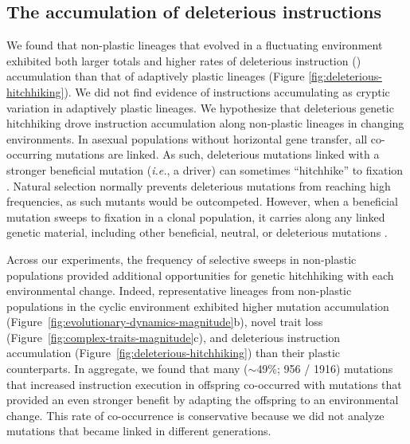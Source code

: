 \subsection{The accumulation of deleterious instructions}

We found that non-plastic lineages that evolved in a fluctuating environment exhibited both larger totals and higher rates of deleterious instruction () accumulation than that of adaptively plastic lineages (Figure \ref{fig:deleterious-hitchhiking}).
We did not find evidence of  instructions accumulating as cryptic variation in adaptively plastic lineages.
We hypothesize that deleterious genetic hitchhiking drove  instruction accumulation along non-plastic lineages in changing environments.
In asexual populations without horizontal gene transfer, all co-occurring mutations are linked.
As such, deleterious mutations linked with a stronger beneficial mutation (\textit{i.e.}, a driver) can sometimes ``hitchhike'' to fixation \citep{smith_hitch-hiking_1974,van_den_bergh_experimental_2018,buskirk_hitchhiking_2017}.
Natural selection normally prevents deleterious mutations from reaching high frequencies, as such mutants would be outcompeted.
However, when a beneficial mutation sweeps to fixation in a clonal population, it carries along any linked genetic material, including other beneficial, neutral, or deleterious mutations  \cite{barton_genetic_2000, smith_hitch-hiking_1974}.

Across our experiments, the frequency of selective sweeps in non-plastic populations provided additional opportunities for genetic hitchhiking with each environmental change. 
Indeed, representative lineages from non-plastic populations in the cyclic environment exhibited higher mutation accumulation (Figure~\ref{fig:evolutionary-dynamics-magnitude}b), novel trait loss (Figure~\ref{fig:complex-traits-magnitude}c), and deleterious instruction accumulation (Figure~\ref{fig:deleterious-hitchhiking}) than their plastic counterparts.
In aggregate, we found that many ($\sim$49\%; 956 / 1916) mutations that increased  instruction execution in offspring co-occurred with mutations that provided an even stronger benefit by adapting the offspring to an environmental change.
This rate of co-occurrence is conservative because we did not analyze mutations that became linked in different generations.


